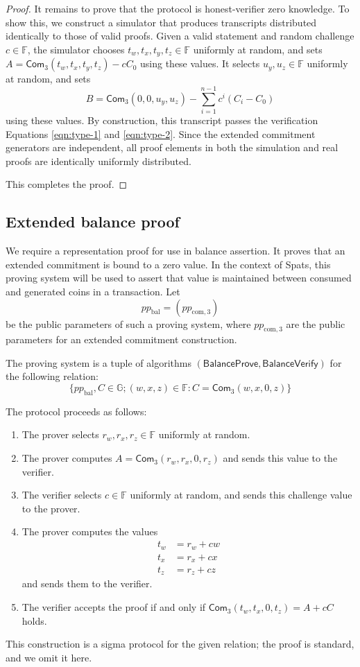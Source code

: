 \documentclass{article}
\newcommand{\G}{\mathbb{G}}
\newcommand{\F}{\mathbb{F}}
\newcommand{\func}[1]{\mathsf{#1}}
\newcommand{\com}{\func{Com}}
\begin{document}
\begin{proof}
It remains to prove that the protocol is honest-verifier zero knowledge.
To show this, we construct a simulator that produces transcripts distributed identically to those of valid proofs.
Given a valid statement and random challenge $c \in \F$, the simulator chooses $t_w, t_x, t_y, t_z \in \F$ uniformly at random, and sets $A = \com_3(t_w, t_x, t_y, t_z) - cC_0$ using these values.
It selects $u_y, u_z \in \F$ uniformly at random, and sets
$$B = \com_3(0, 0, u_y, u_z) - \sum_{i=1}^{n-1} c^i(C_i - C_0)$$
using these values.
By construction, this transcript passes the verification Equations \ref{eqn:type-1} and \ref{eqn:type-2}.
Since the extended commitment generators are independent, all proof elements in both the simulation and real proofs are identically uniformly distributed.

This completes the proof.
\end{proof}


\subsection{Extended balance proof}

We require a representation proof for use in balance assertion.
It proves that an extended commitment is bound to a zero value.
In the context of Spats, this proving system will be used to assert that value is maintained between consumed and generated coins in a transaction.
Let $$pp_{\text{bal}} = ( pp_{\text{com},3})$$ be the public parameters of such a proving system, where $pp_{\text{com},3}$ are the public parameters for an extended commitment construction.

The proving system is a tuple of algorithms $(\func{BalanceProve}, \func{BalanceVerify})$ for the following relation:
$$\{ pp_{\text{bal}}, C \in \G ; (w, x, z) \in \F : C = \com_3(w, x, 0, z) \}$$

The protocol proceeds as follows:
\begin{enumerate}
    \item The prover selects $r_w, r_x, r_z \in \F$ uniformly at random.
    \item The prover computes $A = \com_3(r_w, r_x, 0, r_z)$ and sends this value to the verifier.
    \item The verifier selects $c \in \F$ uniformly at random, and sends this challenge value to the prover.
    \item The prover computes the values
    \begin{align*}
        t_w &= r_w + cw \\
        t_x &= r_x + cx \\
        t_z &= r_z + cz
    \end{align*}
    and sends them to the verifier.
    \item The verifier accepts the proof if and only if $\com_3(t_w, t_x, 0, t_z) = A + cC$ holds.
\end{enumerate}
This construction is a sigma protocol for the given relation; the proof is standard, and we omit it here.
\end{document}
